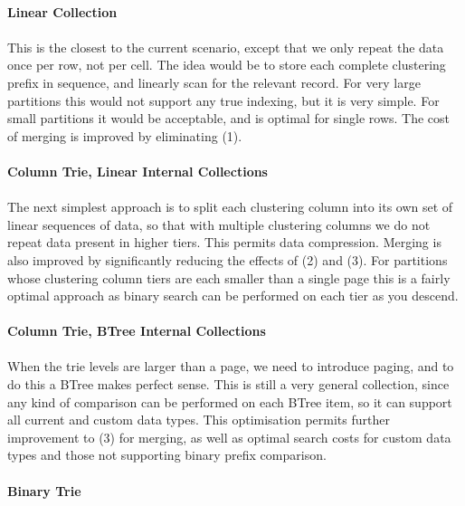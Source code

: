 \documentclass[fleqn]{article}
\begin{document}
\paragraph{Linear Collection}
\paragraph{}
    This is the closest to the current scenario, except that we only repeat the data once per row,
    not per cell. The idea would be to store each complete clustering prefix in sequence,
    and linearly scan for the relevant record. For very large partitions this would not support 
    any true indexing, but it is very simple. For small partitions it would be acceptable, and is
    optimal for single rows. The cost of merging is improved by eliminating (1).
\paragraph{Column Trie, Linear Internal Collections}
\paragraph{}
    The next simplest approach is to split each clustering column into its own set of linear
    sequences of data, so that with multiple clustering columns we do not repeat data present
    in higher tiers. This permits data compression. Merging is also improved by significantly
    reducing the effects of (2) and (3). For partitions whose clustering column tiers are 
    each smaller than a single page this is a fairly optimal approach as binary search 
    can be performed on each tier as you descend.
\paragraph{Column Trie, BTree Internal Collections}
\paragraph{}
    When the trie levels are larger than a page, we need to introduce paging, and to do this a
    BTree makes perfect sense. This is still a very general collection, since any kind of comparison
    can be performed on each BTree item, so it can support all current and custom data types.
    This optimisation permits further improvement to (3) for merging, as well as optimal
    search costs for custom data types and those not supporting binary prefix comparison.
\clearpage
\paragraph{Binary Trie}
\end{document}
